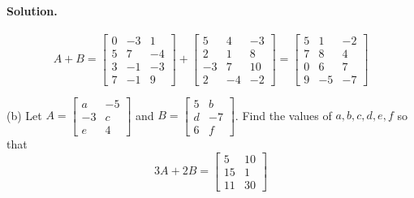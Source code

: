 \paragraph{Solution.}
$$A + B = \begin{bmatrix}
    0 & -3 & 1 \\
    5 & 7 & -4 \\
    3 & -1 & -3 \\
    7 & -1 & 9
\end{bmatrix} + \begin{bmatrix}
    5 & 4 & -3 \\
    2 & 1 & 8 \\
    -3 & 7 & 10 \\
    2 & -4 & -2
\end{bmatrix} = \begin{bmatrix}
    5 & 1 & -2 \\
    7 & 8 & 4 \\
    0 & 6 & 7 \\
    9 & -5 & -7
\end{bmatrix}$$

(b) Let $A = \begin{bmatrix}
    a & -5\\
    -3 & c\\
    e & 4
\end{bmatrix}$ and $B = \begin{bmatrix}
    5 & b\\
    d & -7\\
    6 & f
\end{bmatrix}$. Find the values of $a, b, c, d, e, f$ so that $$3A + 2B = \begin{bmatrix}
    5 & 10\\
    15 & 1\\
    11 & 30
\end{bmatrix}$$
